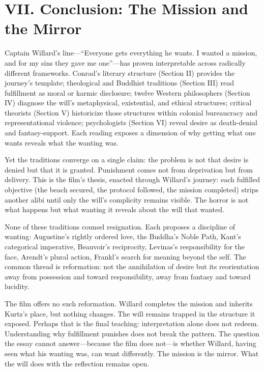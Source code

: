 \section*{VII. Conclusion: The Mission and the Mirror}
\label{sec:vii-conclusion}

Captain Willard's line---``Everyone gets everything he wants. I wanted a mission, and for my 
sins they gave me one''---has proven interpretable across radically different frameworks. 
Conrad's literary structure (Section II) provides the journey's template; theological and 
Buddhist traditions (Section III) read fulfillment as moral or karmic disclosure; twelve 
Western philosophers (Section IV) diagnose the will's metaphysical, existential, and ethical 
structures; critical theorists (Section V) historicize those structures within colonial 
bureaucracy and representational violence; psychologists (Section VI) reveal desire as 
death-denial and fantasy-support. Each reading exposes a dimension of why getting what one 
wants reveals what the wanting was.

Yet the traditions converge on a single claim: the problem is not that desire is denied but 
that it is granted. Punishment comes not from deprivation but from delivery. This is the 
film's thesis, enacted through Willard's journey: each fulfilled objective (the beach secured, 
the protocol followed, the mission completed) strips another alibi until only the will's 
complicity remains visible. The horror is not what happens but what wanting it reveals about 
the will that wanted.

None of these traditions counsel resignation. Each proposes a discipline of wanting: Augustine's 
rightly ordered love, the Buddha's Noble Path, Kant's categorical imperative, Beauvoir's 
reciprocity, Levinas's responsibility for the face, Arendt's plural action, Frankl's search 
for meaning beyond the self. The common thread is reformation: not the annihilation of desire 
but its reorientation away from possession and toward responsibility, away from fantasy and 
toward lucidity.

The film offers no such reformation. Willard completes the mission and inherits Kurtz's place, 
but nothing changes. The will remains trapped in the structure it exposed. Perhaps that is the 
final teaching: interpretation alone does not redeem. Understanding why fulfillment punishes 
does not break the pattern. The question the essay cannot answer---because the film does 
not---is whether Willard, having seen what his wanting was, can want differently. The mission 
is the mirror. What the will does with the reflection remains open.
